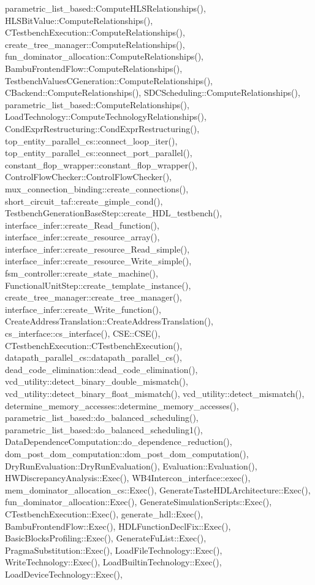 parametric\+\_\+list\+\_\+based\+::\+Compute\+H\+L\+S\+Relationships(), H\+L\+S\+Bit\+Value\+::\+Compute\+Relationships(), C\+Testbench\+Execution\+::\+Compute\+Relationships(), create\+\_\+tree\+\_\+manager\+::\+Compute\+Relationships(), fun\+\_\+dominator\+\_\+allocation\+::\+Compute\+Relationships(), Bambu\+Frontend\+Flow\+::\+Compute\+Relationships(), Testbench\+Values\+C\+Generation\+::\+Compute\+Relationships(), C\+Backend\+::\+Compute\+Relationships(), S\+D\+C\+Scheduling\+::\+Compute\+Relationships(), parametric\+\_\+list\+\_\+based\+::\+Compute\+Relationships(), Load\+Technology\+::\+Compute\+Technology\+Relationships(), Cond\+Expr\+Restructuring\+::\+Cond\+Expr\+Restructuring(), top\+\_\+entity\+\_\+parallel\+\_\+cs\+::connect\+\_\+loop\+\_\+iter(), top\+\_\+entity\+\_\+parallel\+\_\+cs\+::connect\+\_\+port\+\_\+parallel(), constant\+\_\+flop\+\_\+wrapper\+::constant\+\_\+flop\+\_\+wrapper(), Control\+Flow\+Checker\+::\+Control\+Flow\+Checker(), mux\+\_\+connection\+\_\+binding\+::create\+\_\+connections(), short\+\_\+circuit\+\_\+taf\+::create\+\_\+gimple\+\_\+cond(), Testbench\+Generation\+Base\+Step\+::create\+\_\+\+H\+D\+L\+\_\+testbench(), interface\+\_\+infer\+::create\+\_\+\+Read\+\_\+function(), interface\+\_\+infer\+::create\+\_\+resource\+\_\+array(), interface\+\_\+infer\+::create\+\_\+resource\+\_\+\+Read\+\_\+simple(), interface\+\_\+infer\+::create\+\_\+resource\+\_\+\+Write\+\_\+simple(), fsm\+\_\+controller\+::create\+\_\+state\+\_\+machine(), Functional\+Unit\+Step\+::create\+\_\+template\+\_\+instance(), create\+\_\+tree\+\_\+manager\+::create\+\_\+tree\+\_\+manager(), interface\+\_\+infer\+::create\+\_\+\+Write\+\_\+function(), Create\+Address\+Translation\+::\+Create\+Address\+Translation(), cs\+\_\+interface\+::cs\+\_\+interface(), C\+S\+E\+::\+C\+S\+E(), C\+Testbench\+Execution\+::\+C\+Testbench\+Execution(), datapath\+\_\+parallel\+\_\+cs\+::datapath\+\_\+parallel\+\_\+cs(), dead\+\_\+code\+\_\+elimination\+::dead\+\_\+code\+\_\+elimination(), vcd\+\_\+utility\+::detect\+\_\+binary\+\_\+double\+\_\+mismatch(), vcd\+\_\+utility\+::detect\+\_\+binary\+\_\+float\+\_\+mismatch(), vcd\+\_\+utility\+::detect\+\_\+mismatch(), determine\+\_\+memory\+\_\+accesses\+::determine\+\_\+memory\+\_\+accesses(), parametric\+\_\+list\+\_\+based\+::do\+\_\+balanced\+\_\+scheduling(), parametric\+\_\+list\+\_\+based\+::do\+\_\+balanced\+\_\+scheduling1(), Data\+Dependence\+Computation\+::do\+\_\+dependence\+\_\+reduction(), dom\+\_\+post\+\_\+dom\+\_\+computation\+::dom\+\_\+post\+\_\+dom\+\_\+computation(), Dry\+Run\+Evaluation\+::\+Dry\+Run\+Evaluation(), Evaluation\+::\+Evaluation(), H\+W\+Discrepancy\+Analysis\+::\+Exec(), W\+B4\+Intercon\+\_\+interface\+::exec(), mem\+\_\+dominator\+\_\+allocation\+\_\+cs\+::\+Exec(), Generate\+Taste\+H\+D\+L\+Architecture\+::\+Exec(), fun\+\_\+dominator\+\_\+allocation\+::\+Exec(), Generate\+Simulation\+Scripts\+::\+Exec(), C\+Testbench\+Execution\+::\+Exec(), generate\+\_\+hdl\+::\+Exec(), Bambu\+Frontend\+Flow\+::\+Exec(), H\+D\+L\+Function\+Decl\+Fix\+::\+Exec(), Basic\+Blocks\+Profiling\+::\+Exec(), Generate\+Fu\+List\+::\+Exec(), Pragma\+Substitution\+::\+Exec(), Load\+File\+Technology\+::\+Exec(), Write\+Technology\+::\+Exec(), Load\+Builtin\+Technology\+::\+Exec(), Load\+Device\+Technology\+::\+Exec(), 